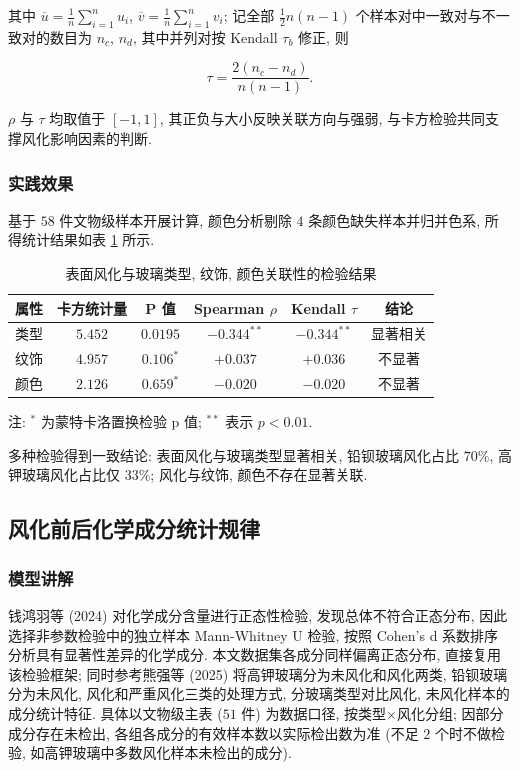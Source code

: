 \documentclass{ctexart}
\begin{document}
其中 $\overline{u}=\frac{1}{n}\sum_{i=1}^{n}u_{i}$, $\overline{v}=\frac{1}{n}\sum_{i=1}^{n}v_{i}$; 记全部 $\frac{1}{2}n\left(n-1\right)$ 个样本对中一致对与不一致对的数目为 $n_{c}$, $n_{d}$, 其中并列对按 Kendall $\tau_{b}$ 修正, 则

\begin{equation*}
\tau=\frac{2\left(n_{c}-n_{d}\right)}{n\left(n-1\right)}.
\end{equation*}

$\rho$ 与 $\tau$ 均取值于 $\left[-1,1\right]$, 其正负与大小反映关联方向与强弱, 与卡方检验共同支撑风化影响因素的判断.


\subsubsection{实践效果}

基于 $58$ 件文物级样本开展计算, 颜色分析剔除 $4$ 条颜色缺失样本并归并色系, 所得统计结果如表 \ref{tab:assoc} 所示.

\begin{table}[htbp]
\centering
\caption{表面风化与玻璃类型, 纹饰, 颜色关联性的检验结果}
\label{tab:assoc}
\begin{tabular}{c|c|c|c|c|c}
\hline
属性 & 卡方统计量 & P 值 & Spearman $\rho$ & Kendall $\tau$ & 结论 \\
\hline
类型 & $5.452$ & $0.0195$ & $-0.344^{**}$ & $-0.344^{**}$ & 显著相关 \\
纹饰 & $4.957$ & $0.106^*$ & $+0.037$ & $+0.036$ & 不显著 \\
颜色 & $2.126$ & $0.659^*$ & $-0.020$ & $-0.020$ & 不显著 \\
\hline
\end{tabular}
\end{table}

注: $^*$ 为蒙特卡洛置换检验 p 值; $^{**}$ 表示 $p<0.01$.

多种检验得到一致结论: 表面风化与玻璃类型显著相关, 铅钡玻璃风化占比 $70\%$, 高钾玻璃风化占比仅 $33\%$; 风化与纹饰, 颜色不存在显著关联.

\subsection{风化前后化学成分统计规律}

\subsubsection{模型讲解}

钱鸿羽等 (2024) 对化学成分含量进行正态性检验, 发现总体不符合正态分布, 因此选择非参数检验中的独立样本 Mann-Whitney U 检验, 按照 Cohen's d 系数排序分析具有显著性差异的化学成分. 本文数据集各成分同样偏离正态分布, 直接复用该检验框架; 同时参考熊强等 (2025) 将高钾玻璃分为未风化和风化两类, 铅钡玻璃分为未风化, 风化和严重风化三类的处理方式, 分玻璃类型对比风化, 未风化样本的成分统计特征. 具体以文物级主表 ($51$ 件) 为数据口径, 按类型$\times$风化分组; 因部分成分存在未检出, 各组各成分的有效样本数以实际检出数为准 (不足 $2$ 个时不做检验, 如高钾玻璃中多数风化样本未检出的成分).
\end{document}
